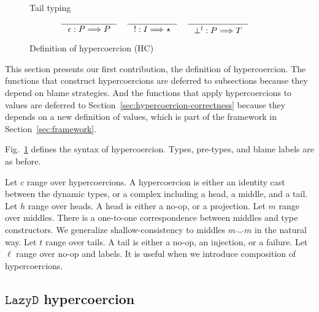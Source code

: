 \documentclass[acmsmall,review,anonymous]{acmart}\settopmatter{printfolios=true,printccs=false,printacmref=false}
\newcommand{\figref}[1]{Fig.~\ref{#1}}
\newcommand{\lazyD}{$\mathtt{Lazy D}$}
\newcommand{\TOOdyn}[0]{\star}
\newcommand{\typingHC}[3]{#1 : #2 \Longrightarrow #3}
\begin{document}
\begin{figure}
		Tail typing \fbox{$ \typingHC{t}{P}{T} $}
		\begin{gather*}
		\inference{}{\typingHC{\epsilon}{P}{P}} \quad
		\inference{}{\typingHC{!}{I}{\TOOdyn}} \quad
		\inference{}{\typingHC{\bot^l}{P}{T}} \quad
		\end{gather*}
	
	\caption{Definition of hypercoercion (HC)}
	\label{fig:hypercoercion}
\end{figure}


This section presents our first contribution, the definition of hypercoercion. 
The functions that construct hypercoercions are deferred to subsections because 
they depend on blame strategies.
And the functions that apply hypercoercions to values are deferred to 
Section~\ref{sec:hypercoercion-correctness} because 
they depends on a new definition of values, which is part of the framework in
Section~\ref{sec:framework}.

\figref{fig:hypercoercion} defines the syntax of hypercoercion. Types, 
pre-types, and blame labels are as before.

Let $ c $ range over hypercoercions. A hypercoercion is either 
an identity cast between the dynamic types, or a complex including a head, a 
middle, and a tail. 
Let $ h $ range over heads. A head is either a no-op, or a projection.
Let $ m $ range over middles. There is a one-to-one 
correspondence between middles and type constructors. 
We generalize shallow-consistency to middles $ m \smile m $ in the natural way.
Let $ t $ range over tails. A tail is either a no-op, an injection, or a 
failure. 
Let $ \ell $ range over no-op and labels. It is useful when we introduce 
composition of hypercoercions.

\subsection{\lazyD{} hypercoercion}
\end{document}
